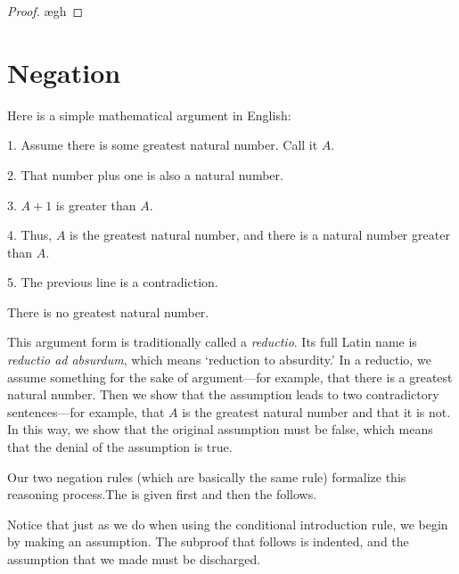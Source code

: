 \begin{proof}
	 
	\open
		\ae{gh}
	\close
\end{proof}


\section{Negation}
Here is a simple mathematical argument in English:
\begin{earg}
\item[1.] Assume there is some greatest natural number. Call it $A$.
\item[2.] That number plus one is also a natural number.
\item[3.] $A+1$ is greater than $A$.
\item[4.] Thus, $A$ is the greatest natural number, and there is a natural number greater than $A$.
\item[5.] The previous line is a contradiction.
\item[\therefore] There is no greatest natural number.
\end{earg}
This argument form is traditionally called a \emph{reductio}. Its full Latin name is \emph{reductio ad absurdum}, which means `reduction to absurdity.' In a reductio, we assume something for the sake of argument---for example, that there is a greatest natural number. Then we show that the assumption leads to two contradictory sentences---for example, that $A$ is the greatest natural number and that it is not. In this way, we show that the original assumption must be false, which means that the denial of the assumption is true. 

Our two negation rules (which are basically the same rule) formalize this reasoning process.The  is given first and then the  follows.


\noindent Notice that just as we do when using the conditional introduction rule, we begin by making an assumption. The subproof that follows is indented, and the assumption that we made must be discharged. 

